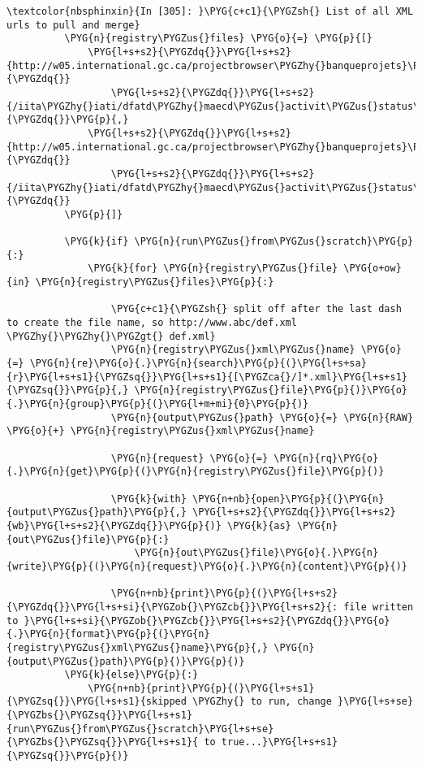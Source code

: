 \documentclass[letterpaper,10pt,english]{sphinxmanual}
\begin{document}
\begin{Verbatim}[commandchars=\\\{\}]
\textcolor{nbsphinxin}{In [305]: }\PYG{c+c1}{\PYGZsh{} List of all XML urls to pull and merge}
          \PYG{n}{registry\PYGZus{}files} \PYG{o}{=} \PYG{p}{[}
              \PYG{l+s+s2}{\PYGZdq{}}\PYG{l+s+s2}{http://w05.international.gc.ca/projectbrowser\PYGZhy{}banqueprojets}\PYG{l+s+s2}{\PYGZdq{}}
                  \PYG{l+s+s2}{\PYGZdq{}}\PYG{l+s+s2}{/iita\PYGZhy{}iati/dfatd\PYGZhy{}maecd\PYGZus{}activit\PYGZus{}status\PYGZus{}2\PYGZus{}3.xml}\PYG{l+s+s2}{\PYGZdq{}}\PYG{p}{,}
              \PYG{l+s+s2}{\PYGZdq{}}\PYG{l+s+s2}{http://w05.international.gc.ca/projectbrowser\PYGZhy{}banqueprojets}\PYG{l+s+s2}{\PYGZdq{}}
                  \PYG{l+s+s2}{\PYGZdq{}}\PYG{l+s+s2}{/iita\PYGZhy{}iati/dfatd\PYGZhy{}maecd\PYGZus{}activit\PYGZus{}status\PYGZus{}4.xml}\PYG{l+s+s2}{\PYGZdq{}}
          \PYG{p}{]}
          
          \PYG{k}{if} \PYG{n}{run\PYGZus{}from\PYGZus{}scratch}\PYG{p}{:}
              \PYG{k}{for} \PYG{n}{registry\PYGZus{}file} \PYG{o+ow}{in} \PYG{n}{registry\PYGZus{}files}\PYG{p}{:}
          
                  \PYG{c+c1}{\PYGZsh{} split off after the last dash to create the file name, so http://www.abc/def.xml \PYGZhy{}\PYGZhy{}\PYGZgt{} def.xml}
                  \PYG{n}{registry\PYGZus{}xml\PYGZus{}name} \PYG{o}{=} \PYG{n}{re}\PYG{o}{.}\PYG{n}{search}\PYG{p}{(}\PYG{l+s+sa}{r}\PYG{l+s+s1}{\PYGZsq{}}\PYG{l+s+s1}{[\PYGZca{}/]*.xml}\PYG{l+s+s1}{\PYGZsq{}}\PYG{p}{,} \PYG{n}{registry\PYGZus{}file}\PYG{p}{)}\PYG{o}{.}\PYG{n}{group}\PYG{p}{(}\PYG{l+m+mi}{0}\PYG{p}{)}
                  \PYG{n}{output\PYGZus{}path} \PYG{o}{=} \PYG{n}{RAW} \PYG{o}{+} \PYG{n}{registry\PYGZus{}xml\PYGZus{}name}
          
                  \PYG{n}{request} \PYG{o}{=} \PYG{n}{rq}\PYG{o}{.}\PYG{n}{get}\PYG{p}{(}\PYG{n}{registry\PYGZus{}file}\PYG{p}{)}
          
                  \PYG{k}{with} \PYG{n+nb}{open}\PYG{p}{(}\PYG{n}{output\PYGZus{}path}\PYG{p}{,} \PYG{l+s+s2}{\PYGZdq{}}\PYG{l+s+s2}{wb}\PYG{l+s+s2}{\PYGZdq{}}\PYG{p}{)} \PYG{k}{as} \PYG{n}{out\PYGZus{}file}\PYG{p}{:}
                      \PYG{n}{out\PYGZus{}file}\PYG{o}{.}\PYG{n}{write}\PYG{p}{(}\PYG{n}{request}\PYG{o}{.}\PYG{n}{content}\PYG{p}{)}
          
                  \PYG{n+nb}{print}\PYG{p}{(}\PYG{l+s+s2}{\PYGZdq{}}\PYG{l+s+si}{\PYGZob{}\PYGZcb{}}\PYG{l+s+s2}{: file written to }\PYG{l+s+si}{\PYGZob{}\PYGZcb{}}\PYG{l+s+s2}{\PYGZdq{}}\PYG{o}{.}\PYG{n}{format}\PYG{p}{(}\PYG{n}{registry\PYGZus{}xml\PYGZus{}name}\PYG{p}{,} \PYG{n}{output\PYGZus{}path}\PYG{p}{)}\PYG{p}{)}
          \PYG{k}{else}\PYG{p}{:}
              \PYG{n+nb}{print}\PYG{p}{(}\PYG{l+s+s1}{\PYGZsq{}}\PYG{l+s+s1}{skipped \PYGZhy{} to run, change }\PYG{l+s+se}{\PYGZbs{}\PYGZsq{}}\PYG{l+s+s1}{run\PYGZus{}from\PYGZus{}scratch}\PYG{l+s+se}{\PYGZbs{}\PYGZsq{}}\PYG{l+s+s1}{ to true...}\PYG{l+s+s1}{\PYGZsq{}}\PYG{p}{)}
\end{Verbatim}
\end{document}
